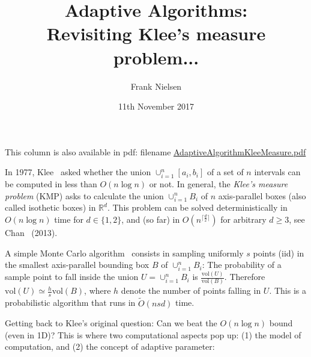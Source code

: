 \documentclass[11pt]{article}
\title{Adaptive Algorithms:\\ Revisiting Klee's measure problem...}
\date{11th November 2017}
\author{Frank Nielsen}
\def\bbR{\mathbb{R}}
\def\vol{\mathrm{vol}}
\def\floor#1{{\lceil {#1} \rceil}}
\begin{document}
\maketitle

This column is also available in pdf: filename \url{AdaptiveAlgorithmKleeMeasure.pdf} 
\vskip 0.5cm


In 1977, Klee~\cite{Klee-1977} asked whether the union $\cup_{i=1}^n [a_i,b_i]$ of a set of $n$ intervals can be computed in less than $O(n\log n)$ or not. 
In general, the {\em Klee's measure problem} (KMP) asks to calculate the union $\cup_{i=1}^n B_i$ of $n$ axis-parallel boxes (also called isothetic boxes) in $\bbR^d$.
This problem can be solved deterministically in $O(n\log n)$ time for $d\in\{1,2\}$, and (so far) in $O(n^{\floor{ {\frac{d}{2}} }})$ for arbitrary $d\geq 3$, see Chan~\cite{ChanKlee-2013} (2013). 

A simple Monte Carlo algorithm~\cite{BringmannKlee-2008} consists in sampling uniformly $s$ points (iid) in the smallest axis-parallel bounding box $B$ of $\cup_{i=1}^n B_i$:
The probability of a sample point to fall inside the union $U=\cup_{i=1}^n B_i$ is $\frac{\vol(U)}{\vol(B)}$. 
Therefore $\vol(U) \simeq \frac{h}{s} \vol(B)$, where $h$ denote the number of points falling in $U$.
This is a probabilistic algorithm that runs in $\tilde O(nsd)$ time.

Getting back to Klee's original question: Can we beat the $O(n\log n)$ bound (even in 1D)?
This is where two computational aspects pop up: (1) the model of computation, and (2) the concept of adaptive parameter:
\end{document}
